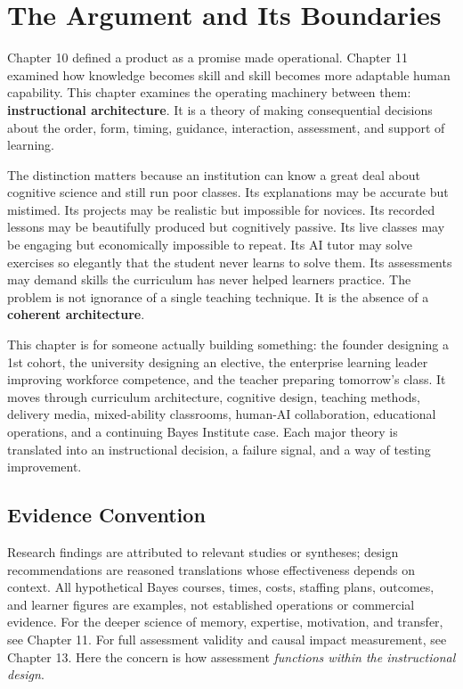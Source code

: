 \section*{The Argument and Its Boundaries}

Chapter 10 defined a product as a promise made operational. Chapter 11 examined how knowledge becomes skill and skill becomes more adaptable human capability. This chapter examines the operating machinery between them: \textbf{instructional architecture}. It is a theory of making consequential decisions about the order, form, timing, guidance, interaction, assessment, and support of learning.

The distinction matters because an institution can know a great deal about cognitive science and still run poor classes. Its explanations may be accurate but mistimed. Its projects may be realistic but impossible for novices. Its recorded lessons may be beautifully produced but cognitively passive. Its live classes may be engaging but economically impossible to repeat. Its AI tutor may solve exercises so elegantly that the student never learns to solve them. Its assessments may demand skills the curriculum has never helped learners practice. The problem is not ignorance of a single teaching technique. It is the absence of a \textbf{coherent architecture}.

This chapter is for someone actually building something: the founder designing a 1st cohort, the university designing an elective, the enterprise learning leader improving workforce competence, and the teacher preparing tomorrow's class. It moves through curriculum architecture, cognitive design, teaching methods, delivery media, mixed-ability classrooms, human-AI collaboration, educational operations, and a continuing Bayes Institute case. Each major theory is translated into an instructional decision, a failure signal, and a way of testing improvement.

\subsection*{Evidence Convention}

Research findings are attributed to relevant studies or syntheses; design recommendations are reasoned translations whose effectiveness depends on context. All hypothetical Bayes courses, times, costs, staffing plans, outcomes, and learner figures are examples, not established operations or commercial evidence. For the deeper science of memory, expertise, motivation, and transfer, see Chapter 11. For full assessment validity and causal impact measurement, see Chapter 13. Here the concern is how assessment \emph{functions within the instructional design}.

